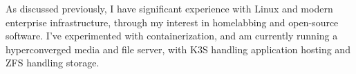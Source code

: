 \documentclass[11pt, letter]{awesome-cv}
\begin{document}
\begin{cvletter}
As discussed previously, I have significant experience with Linux and modern enterprise infrastructure,
through my interest in homelabbing and open-source software.
I've experimented with containerization,
and am currently running a hyperconverged media and file server,
with K3S handling application hosting and ZFS handling storage.





\end{cvletter}
\end{document}
